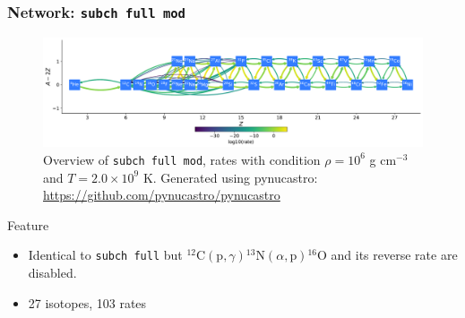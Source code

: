 \documentclass[
	11pt, %
]{beamer}
\begin{document}
\begin{frame}
\frametitle{Network: {\tt subch full mod}}
    \begin{figure}
        \centering
        \includegraphics[width=1\linewidth]{subch_full_mod.pdf}
        \caption{Overview of {\tt subch full mod}, rates with condition $\rho = 10^6$ g $\mathrm{cm}^{-3}$ and $T = 2.0 \times 10^9$ K. Generated using {\sf pynucastro}: \url {https://github.com/pynucastro/pynucastro}}
    \end{figure}
    \begin{block}{Feature}
        \begin{itemize}
            \item Identical to {\tt subch full} but ${}^{12}\mbox{C}(\mbox{p}, \gamma) {}^{13}\mbox{N}(\alpha, \mbox{p}){}^{16}\mbox{O}$ and its reverse rate are disabled.
            \item 27 isotopes, 103 rates
        \end{itemize}
    \end{block}
\end{frame}
\end{document}

